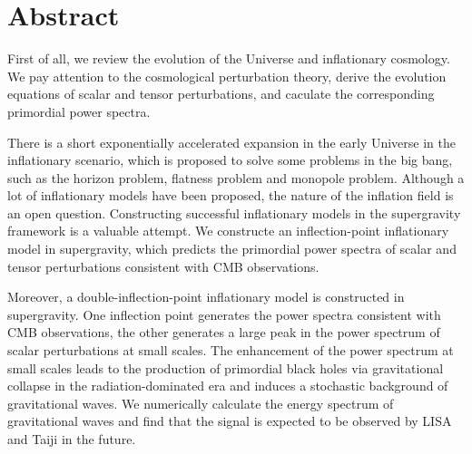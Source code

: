 \intobmk\chapter*{Abstract}%

First of all, we review the evolution of
the Universe and inflationary cosmology. We pay attention to the
cosmological perturbation theory, derive the evolution equations of scalar
and tensor perturbations, and caculate the corresponding primordial
power spectra.
 

There is a short exponentially accelerated expansion in the early 
Universe in the inflationary scenario, which is proposed to solve some
problems in the big bang, such as the horizon problem, flatness
problem and monopole problem. Although a lot of inflationary models have been 
proposed, the nature of the inflation field is an open question.  
Constructing successful inflationary models in the supergravity 
framework is a valuable attempt. We constructe an inflection-point
inflationary model in supergravity, which predicts the primordial power spectra of scalar and tensor perturbations
consistent with CMB observations.

Moreover, a double-inflection-point
inflationary model is constructed in supergravity. One inflection point generates the power 
spectra consistent with CMB observations, the other generates a large peak 
in the power spectrum of scalar perturbations at small scales. The
enhancement of the power spectrum at small scales leads to the production of
primordial black holes via gravitational collapse in the radiation-dominated
era and induces a stochastic background of gravitational waves.
We numerically calculate the energy spectrum of gravitational waves and find that the signal is
expected to be observed by LISA and Taiji in the future.


